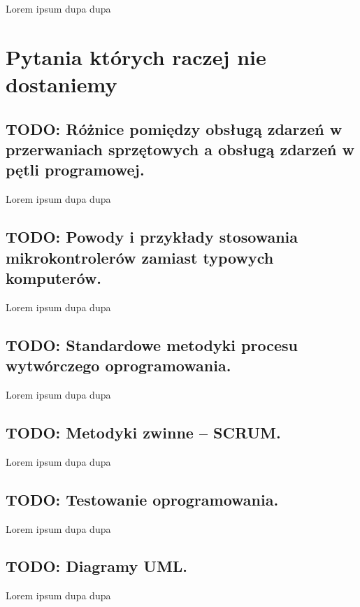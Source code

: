\documentclass[a4paper,12pt,oneside]{book}
\begin{document}
		    Lorem ipsum dupa dupa
		
	\chapter{Pytania których raczej nie dostaniemy}
	
	\setcounter{section}{27}
	\section{\color{red} TODO: Różnice pomiędzy obsługą zdarzeń w przerwaniach sprzętowych a obsługą zdarzeń w pętli programowej.}
					
					Lorem ipsum dupa dupa
	
	\setcounter{section}{28}
	\section{\color{red} TODO: Powody i przykłady stosowania mikrokontrolerów zamiast typowych komputerów. }
					
					Lorem ipsum dupa dupa
	
	\setcounter{section}{38}
	\section{\color{red} TODO: Standardowe metodyki procesu wytwórczego oprogramowania. }
					
					Lorem ipsum dupa dupa
	
	\setcounter{section}{39}
	\section{\color{red} TODO: Metodyki zwinne – SCRUM. }
					
					Lorem ipsum dupa dupa
	
	\setcounter{section}{40}
	\section{\color{red} TODO: Testowanie oprogramowania. }
					
					Lorem ipsum dupa dupa
	
	\setcounter{section}{41}
	\section{\color{red} TODO: Diagramy UML. }
					
					Lorem ipsum dupa dupa
	
\end{document}
